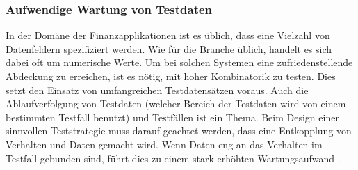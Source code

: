 \subsubsection{Aufwendige Wartung von Testdaten}
In der Domäne der Finanzapplikationen ist es üblich, dass eine Vielzahl von Datenfeldern spezifiziert werden. Wie für die Branche üblich, handelt es sich dabei oft um numerische Werte. Um bei solchen Systemen eine zufriedenstellende Abdeckung zu erreichen, ist es nötig, mit hoher Kombinatorik zu testen. Dies setzt den Einsatz von umfangreichen Testdatensätzen voraus. Auch die Ablaufverfolgung von Testdaten (welcher Bereich der Testdaten wird von einem bestimmten Testfall benutzt) und Testfällen ist ein Thema. Beim Design einer sinnvollen Teststrategie muss darauf geachtet werden, dass eine Entkopplung von Verhalten und Daten gemacht wird. Wenn Daten eng an das Verhalten im Testfall gebunden sind, führt dies zu einem stark erhöhten Wartungsaufwand \cite{baker_model-driven_2005}. 


